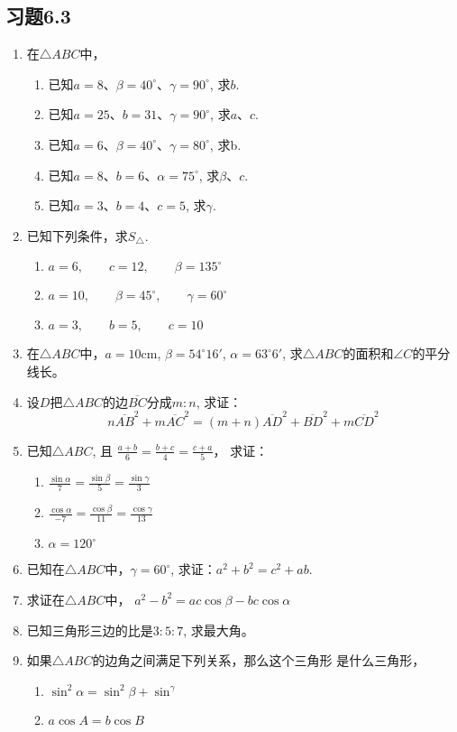 \subsection*{习题6.3}
\begin{enumerate}
    \item 在$\triangle ABC$中，
\begin{enumerate}
    \item 已知$a=8$、$\beta=40^{\circ}$、$\gamma=90^{\circ}$, 求$b$.
    \item 已知$a=25$、$b=31$、$\gamma=90^{\circ}$, 求$a$、$c$.
    \item 已知$a=6$、$\beta=40^{\circ}$、$\gamma=80^{\circ}$, 求b.
    \item 已知$a=8$、$b=6$、$\alpha=75^{\circ}$, 求$\beta$、$c$.
    \item 已知$a=3$、$b=4$、$c=5$, 求$\gamma$.
\end{enumerate}
\item  已知下列条件，求$S_{\triangle}$.
\begin{enumerate}
    \item $a=6,\qquad c=12,\qquad \beta =135^{\circ}$
    \item $a=10,\qquad \beta =45^{\circ},\qquad \gamma=60^{\circ}$
    \item $a=3,\qquad b=5,\qquad c=10$
\end{enumerate}

\item  在$\triangle ABC$中，$a=10$cm, $\beta =54^{\circ}16'$, $\alpha=63^{\circ}6'$, 求$\triangle ABC$的面积和$\angle C$的平分线长。
\item  设$D$把$\triangle ABC$的边$\overline{BC}$分成$m:n$, 求证：
\[n\overline{AB}^2+m \overline{AC}^2=(m+n)\overline{AD}^2+\overline{BD}^2+m\overline{CD}^2\]
\item  已知$\triangle ABC$, 且
$\frac{a+b}{6}=\frac{b+c}{4}=\frac{c+a}{5}$，
求证：
\begin{enumerate}
    \item $\frac{\sin\alpha}{7}=\frac{\sin\beta}{5}=\frac{\sin\gamma}{3}$
    \item $\frac{\cos\alpha}{-7}=\frac{\cos\beta}{11}=\frac{\cos\gamma}{13}$
    \item $\alpha=120^{\circ}$
\end{enumerate}
\item  已知在$\triangle ABC$中，$\gamma=60^{\circ}$, 求证：$a^2+b^2=c^2+ab$.
\item  求证在$\triangle ABC$中，
$a^2-b^2=ac\cos\beta -bc\cos\alpha$
\item  已知三角形三边的比是$3:5:7$, 求最大角。
\item  如果$\triangle ABC$的边角之间满足下列关系，那么这个三角形
是什么三角形，
\begin{enumerate}
    \item $\sin^2\alpha=\sin^2\beta +\sin^\gamma$
    \item $a\cos A=b\cos B$
\end{enumerate}


\end{enumerate}
